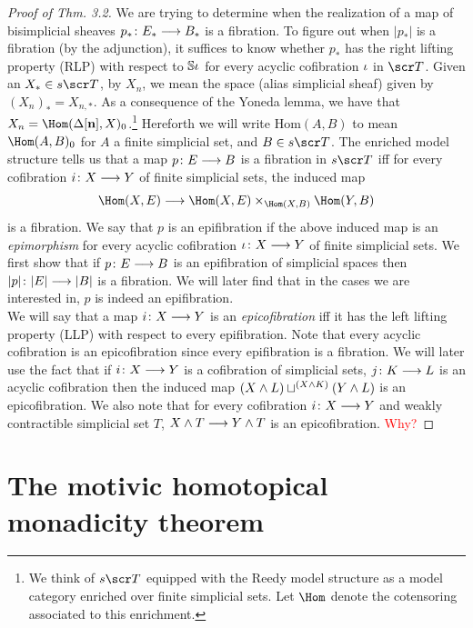 \documentclass{amsart}
\theoremstyle{definition}
\begin{document}
\begin{proof}[Proof of Thm. 3.2]
We are trying to determine when the realization of a map of bisimplicial sheaves $p_* \colon E_* \longrightarrow B_*$ is a fibration. To figure out when $|p_*|$ is a fibration (by the adjunction), it suffices to know whether $p_*$ has the right lifting property (RLP) with respect to $\mathbb{S} \iota$ for every acyclic cofibration $\iota$ in $\sT$. Given an $X_* \in s\sT$, by $X_n$, we mean the space (alias simplicial sheaf) given by $(X_n)_* = X_{n,*}$. As a consequence of the Yoneda lemma, we have that $X_n = \Hom(\DE[\mathbf{n}], X)_0$.\footnote{We think of $s\sT$ equipped with the Reedy model structure as a model category enriched over finite simplicial sets. Let $\Hom$ denote the cotensoring associated to this enrichment.} Hereforth we will write $\mathrm{Hom}(A,B)$ to mean $\Hom(A,B)_0$ for $A$ a finite simplicial set, and $B \in s\sT$. The enriched model structure tells us that a map $p \colon E \longrightarrow B$ is a fibration in $s\sT$ iff for every cofibration $i \colon X \longrightarrow Y$ of finite simplicial sets, the induced map \[\Hom(X,E) \rtarr \Hom(X,E) \times_{\Hom(X,B)} \Hom(Y,B)\]
\noindent is a fibration. We say that $p$ is an epifibration if the above induced map is an \emph{epimorphism} for every acyclic cofibration $\iota \colon X \longrightarrow Y$ of finite simplicial sets. We first show that if $p \colon E \longrightarrow B$ is an epifibration of simplicial spaces then $|p| \colon |E| \longrightarrow |B|$ is a fibration. We will later find that in the cases we are interested in, $p$ is indeed an epifibration.\\

We will say that a map $i \colon X \longrightarrow Y$ is an \emph{epicofibration} iff it has the left lifting property (LLP) with respect to every epifibration. Note that every acyclic cofibration is an epicofibration since every epifibration is a fibration. We will later use the fact that if $i \colon X \longrightarrow Y$ is a cofibration of simplicial sets, $j \colon K \longrightarrow L$ is an acyclic cofibration then the induced map $(X \wedge L) \sqcup^{(X \wedge K)} (Y \wedge L)$ is an epicofibration. We also note that for every cofibration $i \colon X \longrightarrow Y$ and weakly contractible simplicial set $T$, $X \wedge T \longrightarrow Y \wedge T$ is an epicofibration. \textcolor{red}{Why?}
\end{proof}

\section{The motivic homotopical monadicity theorem}\label{sec:htpymonad}
\end{document}
